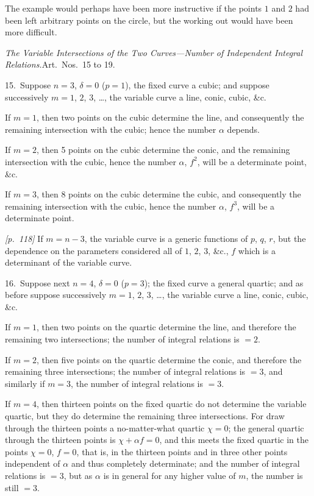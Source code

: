 \documentclass[11pt,a4paper]{article}
\theoremstyle{plain}
\theoremstyle{definition}
\theoremstyle{remark}
\begin{document}
The example would perhaps have been more instructive if the points $1$ and $2$ had been left arbitrary points on the circle, but the working out would have been more difficult.

\textit{The Variable Intersections of the Two Curves---Number of Independent Integral Relations.}\quad Art.\ Nos.\ 15 to 19.

15.\ Suppose $n = 3$, $\delta = 0$ ($p = 1$), the fixed curve a cubic; and suppose successively $m = 1$, $2$, $3$, \ldots, the variable curve a line, conic, cubic, \&c.

If $m = 1$, then two points on the cubic determine the line, and consequently the remaining intersection with the cubic; hence the number $\alpha$ depends.

If $m = 2$, then 5 points on the cubic determine the conic, and the remaining intersection with the cubic, hence the number $\alpha$, $f^2$, will be a determinate point, \&c.

If $m = 3$, then 8 points on the cubic determine the cubic, and consequently the remaining intersection with the cubic, hence the number $\alpha$, $f^3$, will be a determinate point.

\noindent\textit{[p.~118]} If $m = n - 3$, the variable curve is a generic functions of $p$, $q$, $r$, but the dependence on the parameters considered all of $1$, $2$, $3$, \&c., $f$ which is a determinant of the variable curve.

16.\ Suppose next $n = 4$, $\delta = 0$ ($p = 3$); the fixed curve a general quartic; and as before suppose successively $m = 1$, $2$, $3$, \ldots, the variable curve a line, conic, cubic, \&c.

If $m = 1$, then two points on the quartic determine the line, and therefore the remaining two intersections; the number of integral relations is $= 2$.

If $m = 2$, then five points on the quartic determine the conic, and therefore the remaining three intersections; the number of integral relations is $= 3$, and similarly if $m = 3$, the number of integral relations is $= 3$.

If $m = 4$, then thirteen points on the fixed quartic do not determine the variable quartic, but they do determine the remaining three intersections. For draw through the thirteen points a no-matter-what quartic $\chi = 0$; the general quartic through the thirteen points is $\chi + \alpha f = 0$, and this meets the fixed quartic in the points $\chi = 0$, $f = 0$, that is, in the thirteen points and in three other points independent of $\alpha$ and thus completely determinate; and the number of integral relations is $= 3$, but as $\alpha$ is in general for any higher value of $m$, the number is still $= 3$.
\end{document}
